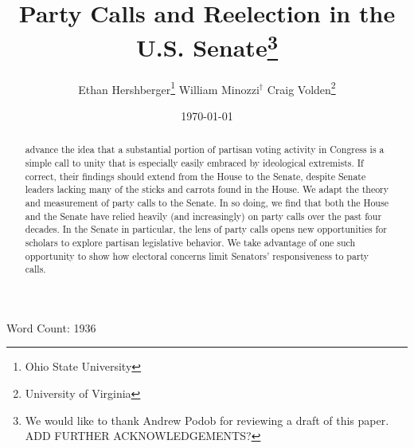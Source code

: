 \documentclass[12pt]{article}
\begin{document}


\title{Party Calls and Reelection in the U.S. Senate\thanks{
We would like to thank Andrew Podob for reviewing a draft of this paper.
ADD FURTHER ACKNOWLEDGEMENTS?}
}

\author{
  Ethan Hershberger\thanks{
    \small Ohio State University
  }\quad
  William Minozzi$^\dagger$\quad
  Craig Volden\thanks{
    \small University of Virginia
  }\\
}

\date{\today}

\maketitle

\begin{center}

\vspace{.1in}
Word Count: 1936
\end{center}
\vspace{.25in}

\begin{abstract}
\singlespacing
\noindent
\cite{Minozzi:2013} advance the idea that a substantial portion of partisan voting activity in Congress is a simple call to unity that is especially easily embraced by ideological extremists.  If correct, their findings should extend from the House to the Senate, despite Senate leaders lacking many of the sticks and carrots found in the House.  We adapt the theory and measurement of party calls to the Senate.  In so doing, we find that both the House and the Senate have relied heavily (and increasingly) on party calls over the past four decades.  In the Senate in particular, the lens of party calls opens new opportunities for scholars to explore partisan legislative behavior.  We take advantage of one such opportunity to show how electoral concerns limit Senators' responsiveness to party calls.
\end{abstract}

\clearpage
\setcounter{page}{1}

\doublespacing
\end{document}
